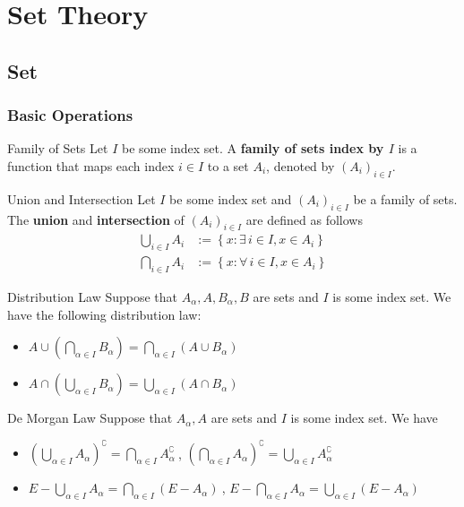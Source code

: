 
\chapter{Set Theory}
\thispagestyle{empty}
\setcounter{page}{1}
\section{Set}
\subsection{Basic Operations}
\begin{definition}{Family of Sets}{}
    Let $I$ be some index set. A \textbf{family of sets index by $I$} is a function that maps each index $i\in I$ to a set $A_i$, denoted by $\left(A_i\right)_{i\in I}$.
\end{definition}

\begin{definition}{Union and Intersection}{}
    Let $I$ be some index set and $(A_i)_{i\in I}$ be a family of sets. The \textbf{union} and \textbf{intersection} of $(A_i)_{i\in I}$ are defined as follows
	\begin{align*}
		\bigcup_{i\in I} A_i&:=\left\{x:\exists\,i\in I,x\in A_i \right\}\\
		\bigcap_{i\in I} A_i&:=\left\{x:\forall\,i\in I,x\in A_i \right\}
	\end{align*}
\end{definition}

\begin{proposition}{Distribution Law}{}
	Suppose that $A_\alpha,A,B_\alpha,B$ are sets and $I$ is some index set. We have the following distribution law:
	\begin{itemize}
        \item $A\cup\left(\bigcap\limits_{\alpha\in I}B_\alpha\right)=\bigcap\limits_{\alpha\in I}\left(A\cup B_\alpha\right)$
		\item $A\cap\left(\bigcup\limits_{\alpha\in I}B_\alpha\right)=\bigcup\limits_{\alpha\in I}\left(A\cap B_\alpha\right)$
	\end{itemize}
\end{proposition}


\begin{proposition}{De Morgan Law}{}
	Suppose that $A_\alpha,A$ are sets and $I$ is some index set. We have
	\begin{itemize}
		\item $\left(\bigcup\limits_{\alpha\in I}A_\alpha\right)^\complement=\bigcap\limits_{\alpha\in I}A_\alpha^{\complement}\ $, $\left(\bigcap\limits_{\alpha\in I}A_\alpha\right)^\complement=\bigcup\limits_{\alpha\in I}A_\alpha^{\complement}$
		\item $E-\bigcup\limits_{\alpha\in I}A_\alpha=\bigcap\limits_{\alpha\in I}\left(E-A_\alpha\right)\ $, $E-\bigcap\limits_{\alpha\in I}A_\alpha=\bigcup\limits_{\alpha\in I}\left(E-A_\alpha\right)$
	\end{itemize}
\end{proposition}


